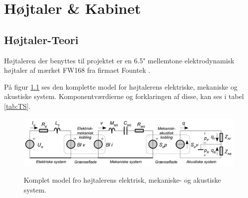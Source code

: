 \chapter{Højtaler \& Kabinet}

\section{Højtaler-Teori}
Højtaleren der benyttes til projektet er en 6.5" mellemtone elektrodynamisk højtaler af mærket FW168\cite{FW168} fra firmaet Fountek \cite{Fountek}. 

På figur \ref{fig:kompletmodel} ses den komplette model for højtalerens elektriske, mekaniske og akustiske system.\citep{Elektroakustik} Komponentværdierne og forklaringen af disse, kan ses i tabel \ref{tab:TS}.

\begin{figure}[H]
	\centering
	\includegraphics[width=\textwidth]{Pics/kompletmodel.PNG}
	\label{fig:kompletmodel}
	\caption{Komplet model fro højtalerens elektrisk, mekaniske- og akustiske system. } 
\end{figure}

